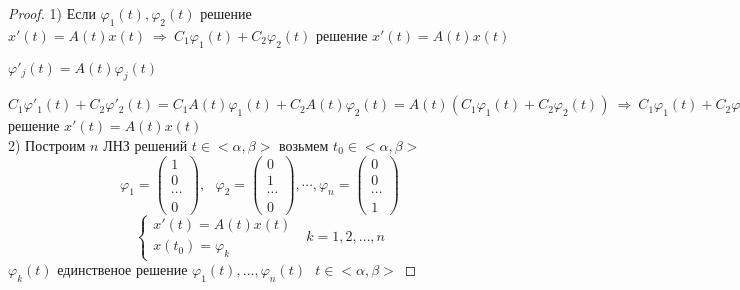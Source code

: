\begin{proof}
  1) Если $\varphi_1(t), \varphi_2(t)$ решение $x'(t) = A(t)x(t) ~ \Rightarrow ~
  C_1\varphi_1(t) + C_2\varphi_2(t)$ решение $x'(t) = A(t)x(t)$

  $\varphi'_j(t) = A(t)\varphi_j(t)$

  $C_1 \varphi'_1(t) + C_2 \varphi'_2(t) = C_1A(t) \varphi_1(t) +
  C_2A(t)\varphi_2(t) = A(t)(C_1\varphi_1(t) + C_2\varphi_2(t)) ~
  \Rightarrow ~ C_1 \varphi_1(t) + C_2 \varphi_2(t)$ решение
  $x'(t) = A(t)x(t)$\\

  2) Построим $n$ ЛНЗ решений $t \in <\alpha, \beta>$ возьмем $t_0 \in
  <\alpha, \beta>$
  $$
  \varphi_1 =
  \left(
  \begin{array}{c}
    1 \\
    0 \\
    \cdots \\
    0
  \end{array}
  \right), ~~~
  \varphi_2 =
  \left(
  \begin{array}{c}
    0 \\
    1 \\
    \cdots \\
    0
  \end{array}
  \right), \cdots,
  \varphi_n =
  \left(
  \begin{array}{c}
    0 \\
    0 \\
    \cdots \\
    1
  \end{array}
  \right)
  $$
  $$
  \left\{
  \begin{array}{l}
    x'(t) = A(t)x(t) \\
    x(t_0) = \varphi_k
  \end{array}
  \right. ~~~ k = 1, 2, \ldots, n
  $$
  $\varphi_k(t)$ единственое решение $\varphi_1(t), \ldots, \varphi_n(t) ~~~
  t \in <\alpha, \beta>$


\end{proof}
